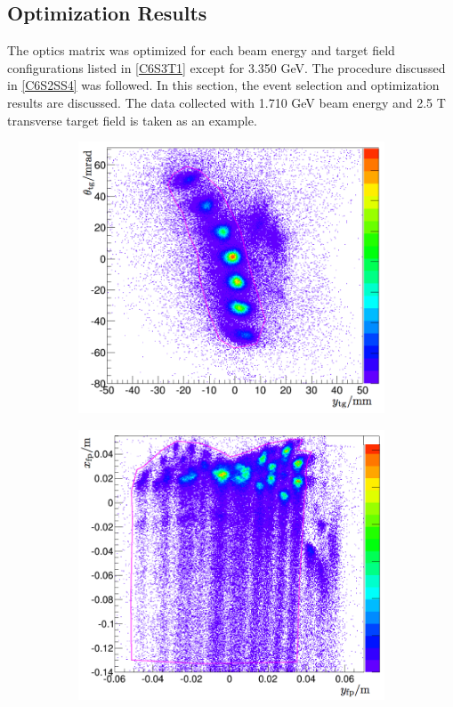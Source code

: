 \subsection{Optimization Results}
\label{C6S3SS2}

The optics matrix was optimized for each beam energy and target field configurations listed in \cref{C6S3T1} except for 3.350 GeV. The procedure discussed in \cref{C6S2SS4} was followed. In this section, the event selection and optimization results are discussed. The data collected with 1.710 GeV beam energy and 2.5 T transverse target field is taken as an example.

\begin{figure}[b!]
  \centering
  \begin{subfigure}[t]{0.49\textwidth}
    \includegraphics[width=\textwidth]{figs/foil-cut.png}
  \end{subfigure}
  \begin{subfigure}[t]{0.49\textwidth}
    \includegraphics[width=\textwidth]{figs/focal-plane-cut.png}

\end{subfigure}
\end{figure}
